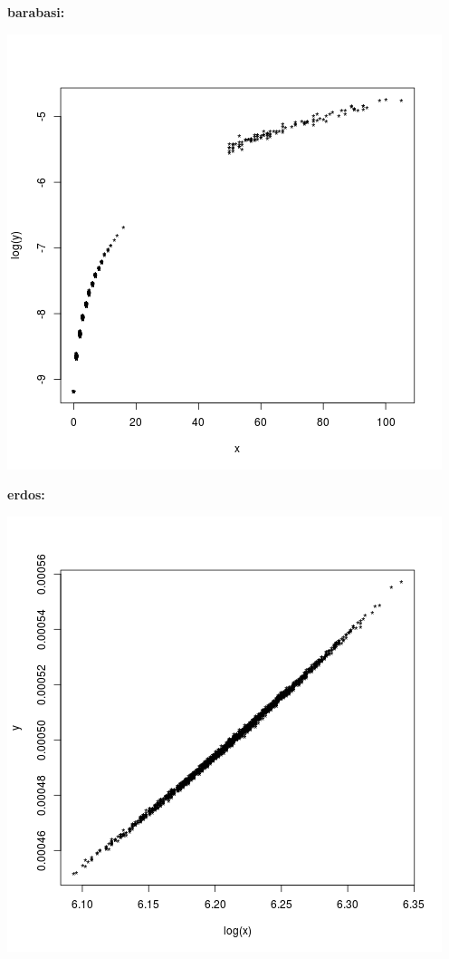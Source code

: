 \documentclass[palatino,nochap]{apuntes}
\begin{document}
\textbf{barabasi:}

\begin{center}
	\includegraphics[scale=0.45]{img/barabasi_grado-pr}
\end{center}


\textbf{erdos:}

\begin{center}
	\includegraphics[scale=0.45]{img/erdos_grado-pr}
\end{center}
\end{document}
